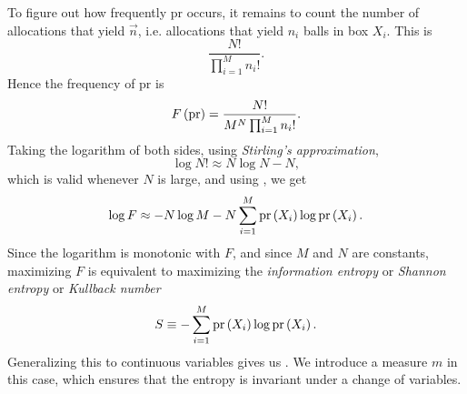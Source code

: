 To figure out how frequently pr occurs, it remains to count the number of
allocations that yield $\vec{n}$, i.e. allocations
that yield $n_i$ balls in box $X_i$. This is
\begin{equation}
\frac{N!}{\prod_{i=1}^Mn_i!}.
\end{equation}
Hence the frequency of pr is
\begin{equation}
F\left({\rm pr}\right)=\frac{N!}{M^N\prod_{i=1}^Mn_i!}.
\end{equation}
Taking the logarithm of both sides, using {\it Stirling's
approximation},
\begin{equation}
\log N!\approx N\log N-N,
\end{equation}
which is valid whenever $N$ is large, and using
, we get
\begin{equation}
\log F \approx  -N\log M -N\sum_{i=1}^M \operatorname{pr}\left(X_i\right)\log\operatorname{pr}\left(X_i\right).
\end{equation}
Since the logarithm is monotonic with $F$, and since $M$ and $N$ are constants,
maximizing $F$ is equivalent to maximizing the {\it information
entropy} or {\it Shannon
entropy} or {\it Kullback number}
\begin{equation}
S\equiv  -\sum_{i=1}^M \operatorname{pr}\left(X_i\right)\log\operatorname{pr}\left(X_i\right).
\end{equation}
Generalizing this to continuous variables gives us
. We introduce a measure $m$ in this case, which
ensures that the entropy is invariant under a change of variables.


% 



